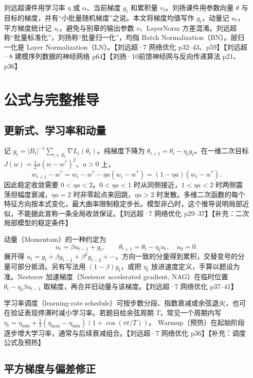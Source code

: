 \documentclass[UTF8,a4paper,zihao=-4,fontset=fandol]{ctexrep}
\begin{document}
刘远超课件用学习率 $\eta$ 或 $\alpha$、当前梯度 $g_t$ 和累积量 $v_t$。刘扬课件用参数向量 $\theta$ 与目标的梯度，并有“小批量随机梯度”之说。本文将梯度均值写作 $g_t$，动量记 $u_t$，平方梯度统计记 $s_t$，避免与别章的输出参数 $v$、LayerNorm 方差混淆。刘远超称“批量标准化”，刘扬称“批量归一化”，均指 Batch Normalization（BN）。层归一化是 Layer Normalization（LN）。【刘远超·7 网络优化 p32--43、p59】【刘远超·8 建模序列数据的神经网络 p64】【刘扬·10前馈神经网与反向传递算法 p21、p36】

\section{公式与完整推导}

\subsection*{更新式、学习率和动量}

记 $g_t=|B_t|^{-1}\sum_{i\in B_t}\nabla L_i(\theta_t)$。纯梯度下降为 $\theta_{t+1}=\theta_t-\eta_t g_t$。在一维二次目标 $J(w)=\frac12 a(w-w^*)^2$、$a>0$ 上，
\[
 w_{t+1}-w^*
 =w_t-w^*-\eta a(w_t-w^*)=(1-\eta a)(w_t-w^*).
\]
因此稳定收敛需要 $0<\eta a<2$。$0<\eta a<1$ 时从同侧接近，$1<\eta a<2$ 时两侧震荡但幅度衰减，$\eta a=2$ 时非零起点来回跳，$\eta a>2$ 时发散。多维二次函数的每个特征方向按本式变化，最大曲率限制稳定步长。模型非凸时，这个推导说明局部近似，不能据此宣称一条全局收敛保证。【刘远超·7 网络优化 p29--37】【补充：二次局部模型的稳定条件】

动量（Momentum）的一种约定为
\[
 u_t=\beta u_{t-1}+g_t,\qquad
 \theta_{t+1}=\theta_t-\eta_t u_t,\quad u_0=0 .
\]
展开得 $u_t=g_t+\beta g_{t-1}+\beta^2g_{t-2}+\cdots$，方向一致的分量得到累积，交替变号的分量可部分抵消。另有写法用 $(1-\beta)g_t$，或把 $\eta_t$ 放进速度定义，手算以题设为准。Nesterov 加速梯度（Nesterov accelerated gradient, NAG）在临时位置 $\theta_t-\eta_t\beta u_{t-1}$ 取梯度，再合并旧动量与该梯度。【刘远超·7 网络优化 p37--41】

学习率调度（learning-rate schedule）可按步数分段、指数衰减或余弦退火，也可在验证表现停滞时减小学习率。若题目给余弦周期 $T$，常见一个周期内写
$\eta_t=\eta_{\min}+\tfrac12(\eta_{\max}-\eta_{\min})(1+\cos(\pi t/T))$。
Warmup（预热）在起始阶段逐步增大学习率，通常与后续衰减组合。【刘远超·7 网络优化 p36】【补充：调度公式及预热】

\subsection*{平方梯度与偏差修正}
\end{document}
